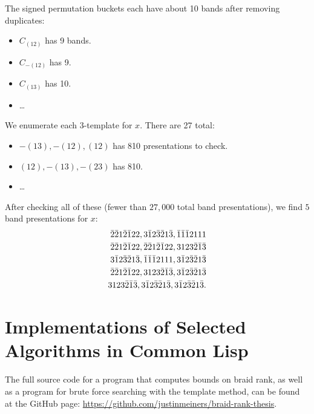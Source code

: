 \documentclass[12pt]{thesis}
\begin{document}
The signed permutation buckets each have about 10 bands after removing duplicates:
\begin{itemize}
    \item $C_{(1 2)}$ has 9 bands.
    \item $C_{-(1 2)}$ has 9.
    \item $C_{(1 3)}$ has 10.
    \item \ldots
\end{itemize}

We enumerate each $3$-template for $x$.
There are 27 total:
\begin{itemize}
    \item $-(1 3), -(1 2), (1 2)$ has 810 presentations to check.
    \item $(1  2), -(1 3), -(2  3)$ has 810.
    \item \ldots
\end{itemize}
After checking all of these (fewer than $27,000$ total band presentations), we find $5$ band
presentations for $x$:
\[
\begin{split}
\bar{2}\bar{2}1\bar{2}\bar{1}22, 3\bar{1}2\bar{3}\bar{2}1\bar{3}, \bar{1}\bar{1}\bar{1}2111 \\
\bar{2}\bar{2}1\bar{2}\bar{1}22, \bar{2}\bar{2}1\bar{2}\bar{1}22, 3123\bar{2}\bar{1}\bar{3} \\
3\bar{1}2\bar{3}\bar{2}1\bar{3}, \bar{1}\bar{1}\bar{1}2111, 3\bar{1}2\bar{3}\bar{2}1\bar{3} \\
\bar{2}\bar{2}1\bar{2}\bar{1}22, 3123\bar{2}\bar{1}\bar{3}, 3\bar{1}2\bar{3}\bar{2}1\bar{3} \\
3123\bar{2}\bar{1}\bar{3}, 3\bar{1}2\bar{3}\bar{2}1\bar{3}, 3\bar{1}2\bar{3}\bar{2}1\bar{3}. \\
\end{split}
\]

\appendix

\chapter{Implementations of Selected Algorithms in Common Lisp}

The full source code for a program
that computes bounds on braid rank,
as well as a program for brute force searching with the template method,
can be found at the GitHub page: \url{https://github.com/justinmeiners/braid-rank-thesis}.
\end{document}
